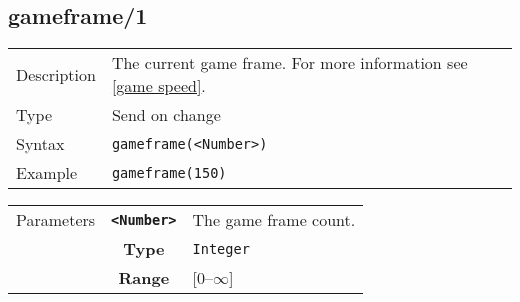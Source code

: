 \subsection{gameframe/1}
\begin{tabularx}{\textwidth}{lX}
 Description & The current game frame. For more information see \ref{game speed}. \\
 Type & Send on change \\
 Syntax & \verb|gameframe(<Number>)| \\
 Example & \verb|gameframe(150)|   \\
 \end{tabularx}
 \begin{tabularx}{\textwidth}{l | c | p{8cm}|}
 \cline{2-3}
  Parameters & \textbf{\verb|<Number>|} & The game frame count. \\
             & \textbf{Type} & \verb|Integer| \\
             & \textbf{Range} & [0--$\infty$] \\
            \cline{2-3}
\end{tabularx}

